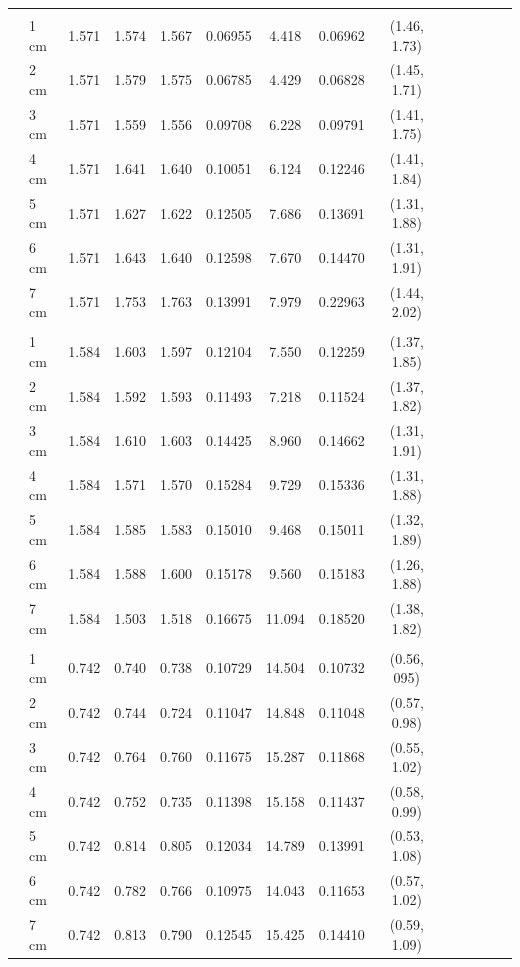 \documentclass[a4paper 12pt]{article}
\numberwithin{equation}{section}
\begin{document}
\begin{small}
\begin{table}[h!]
\begin{footnotesize}
\begin{tabular}{clclclclclclcl}
 \raisebox{1ex}{\bf age 3}  \\ [1.0ex]
&   1 cm & 1.571 &    1.574  & 1.567 &         0.06955& 4.418  & 0.06962 & (1.46, 1.73)\\
&   2 cm & 1.571 &    1.579  & 1.575 &         0.06785& 4.429  & 0.06828 & (1.45, 1.71)\\
&   3 cm & 1.571 &    1.559  & 1.556 &         0.09708& 6.228  & 0.09791 & (1.41, 1.75)\\
&   4 cm & 1.571 &    1.641  & 1.640 &         0.10051& 6.124  & 0.12246 & (1.41, 1.84)\\
&   5 cm & 1.571 &    1.627  & 1.622 &         0.12505& 7.686  & 0.13691 & (1.31, 1.88)\\
&   6 cm & 1.571 &    1.643  & 1.640 &         0.12598& 7.670  & 0.14470 & (1.31, 1.91)\\
&   7 cm & 1.571 &    1.753  & 1.763 &         0.13991& 7.979  & 0.22963 & (1.44, 2.02) \\[1.5ex]

 \raisebox{1ex}{\bf age 4}  \\ [1.0ex]
&   1 cm & 1.584 &    1.603  & 1.597 &         0.12104& 7.550  & 0.12259 & (1.37, 1.85)\\
&   2 cm & 1.584 &    1.592  & 1.593 &         0.11493& 7.218  & 0.11524 & (1.37, 1.82)\\
&   3 cm & 1.584 &    1.610  & 1.603 &         0.14425& 8.960  & 0.14662 & (1.31, 1.91)\\
&   4 cm & 1.584 &    1.571  & 1.570 &         0.15284& 9.729  & 0.15336 & (1.31, 1.88)\\
&   5 cm & 1.584 &    1.585  & 1.583 &         0.15010& 9.468  & 0.15011 & (1.32, 1.89)\\
&   6 cm & 1.584 &    1.588  & 1.600 &         0.15178& 9.560  & 0.15183 & (1.26, 1.88)\\
&   7 cm & 1.584 &    1.503  & 1.518 &         0.16675& 11.094 & 0.18520 & (1.38, 1.82) \\[1.5ex]

 \raisebox{1ex}{\bf age 5}  \\ [1.0ex]
&   1 cm & 0.742 &    0.740 & 0.738 &          0.10729& 14.504 & 0.10732 & (0.56, 095)\\
&   2 cm & 0.742 &    0.744 & 0.724 &          0.11047& 14.848 & 0.11048 & (0.57, 0.98)\\
&   3 cm & 0.742 &    0.764 & 0.760 &          0.11675& 15.287 & 0.11868 & (0.55, 1.02)\\
&   4 cm & 0.742 &    0.752 & 0.735 &          0.11398& 15.158 & 0.11437 & (0.58, 0.99)\\
&   5 cm & 0.742 &    0.814 & 0.805 &          0.12034& 14.789 & 0.13991 & (0.53, 1.08)\\
&   6 cm & 0.742 &    0.782 & 0.766 &          0.10975& 14.043 & 0.11653 & (0.57, 1.02)\\
&   7 cm & 0.742 &    0.813 & 0.790 &          0.12545& 15.425 & 0.14410 & (0.59, 1.09) \\[1.5ex]


\end{tabular}
\end{footnotesize}
\end{table}
\end{small}
\end{document}
